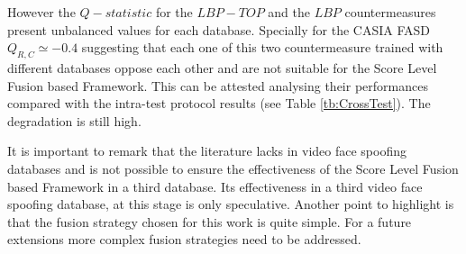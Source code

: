 However the $Q-statistic$ for the $LBP-TOP$ and the $LBP$ countermeasures present unbalanced values for each database. Specially for the CASIA FASD $Q_{R,C}\simeq-0.4$ suggesting that each one of this two countermeasure trained with different databases oppose each other and are not suitable for the Score Level Fusion based Framework. This can be attested analysing their performances compared with the intra-test protocol results (see Table \ref{tb:CrossTest}). The degradation is still high.


It is important to remark that the literature lacks in video face spoofing databases and is not possible to ensure the effectiveness of the Score Level Fusion based Framework in a third database. Its effectiveness in a third video face spoofing database, at this stage is only speculative. Another point to highlight is that the fusion strategy chosen for this work is quite simple. For a future extensions more complex fusion strategies need to be addressed.

